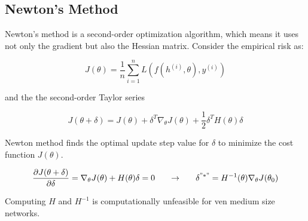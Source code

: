 \subsection{Newton's Method}

Newton's method is a second-order optimization algorithm, which means it uses not only the gradient but also the Hessian matrix. Consider the empirical risk as:

$$ J(\theta) = \frac{1}{n} \sum_{i=1}^n L \left( f \left( h^{(i)}, \theta \right) , y^{(i)} \right) $$

\newpage
\noindent and the the second-order Taylor series

$$ J(\theta + \delta) = J(\theta) + \delta^T \nabla_{\theta} J(\theta) + \frac{1}{2} \delta^T H(\theta) \delta $$

\noindent Newton method finds the optimal update step value for $\delta$ to minimize the cost function $J(\theta)$.

$$ \frac{\partial J(\theta + \delta)}{\partial \delta} = \nabla_{\theta} J(\theta) + H(\theta) \delta = 0 ~~~~~ \rightarrow ~~~~~ \delta^{"*"} = H^{-1} (\theta) \nabla_{\theta} J(\theta_0) $$

\noindent Computing $H$ and $H^{-1}$ is computationally unfeasible for ven medium size networks. 





